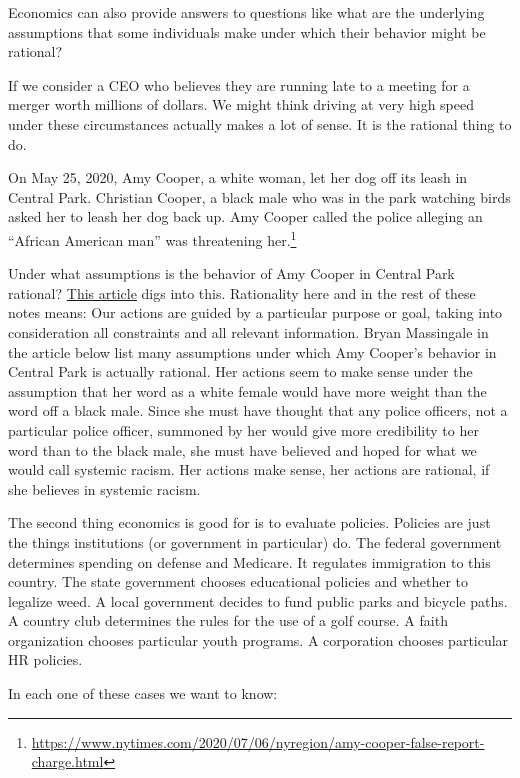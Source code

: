 \documentclass[
]{book}
\begin{document}
Economics can also provide answers to questions like what are the underlying assumptions that some individuals make under which their behavior might be rational?

If we consider a CEO who believes they are running late to a meeting for a merger worth millions of dollars. We might think driving at very high speed under these circumstances actually makes a lot of sense. It is the rational thing to do.

On May 25, 2020, Amy Cooper, a white woman, let her dog off its leash in Central Park. Christian Cooper, a black male who was in the park watching birds asked her to leash her dog back up. Amy Cooper called the police alleging an ``African American man'' was threatening her.\footnote{\url{https://www.nytimes.com/2020/07/06/nyregion/amy-cooper-false-report-charge.html}}

Under what assumptions is the behavior of Amy Cooper in Central Park rational? \href{https://www.ncronline.org/news/opinion/assumptions-white-privilege-and-what-we-can-do-about-it}{This article} digs into this. Rationality here and in the rest of these notes means: Our actions are guided by a particular purpose or goal, taking into consideration all constraints and all relevant information. Bryan Massingale in the article below list many assumptions under which Amy Cooper's behavior in Central Park is actually rational. Her actions seem to make sense under the assumption that her word as a white female would have more weight than the word off a black male. Since she must have thought that any police officers, not a particular police officer, summoned by her would give more credibility to her word than to the black male, she must have believed and hoped for what we would call systemic racism. Her actions make sense, her actions are rational, if she believes in systemic racism.

The second thing economics is good for is to evaluate policies. Policies are just the things institutions (or government in particular) do. The federal government determines spending on defense and Medicare. It regulates immigration to this country. The state government chooses educational policies and whether to legalize weed. A local government decides to fund public parks and bicycle paths. A country club determines the rules for the use of a golf course. A faith organization chooses particular youth programs. A corporation chooses particular HR policies.

In each one of these cases we want to know:
\end{document}
